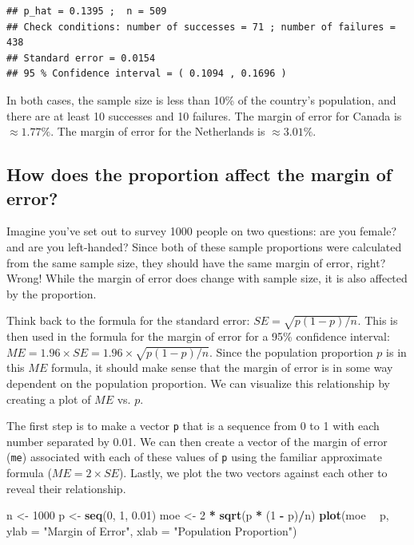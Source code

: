 \documentclass[]{article}
\newenvironment{Shaded}{\begin{snugshade}}{\end{snugshade}}
\newcommand{\KeywordTok}[1]{\textcolor[rgb]{0.13,0.29,0.53}{\textbf{#1}}}
\newcommand{\DataTypeTok}[1]{\textcolor[rgb]{0.13,0.29,0.53}{#1}}
\newcommand{\DecValTok}[1]{\textcolor[rgb]{0.00,0.00,0.81}{#1}}
\newcommand{\FloatTok}[1]{\textcolor[rgb]{0.00,0.00,0.81}{#1}}
\newcommand{\StringTok}[1]{\textcolor[rgb]{0.31,0.60,0.02}{#1}}
\newcommand{\OperatorTok}[1]{\textcolor[rgb]{0.81,0.36,0.00}{\textbf{#1}}}
\newcommand{\NormalTok}[1]{#1}
\begin{document}
\begin{verbatim}
## p_hat = 0.1395 ;  n = 509 
## Check conditions: number of successes = 71 ; number of failures = 438 
## Standard error = 0.0154 
## 95 % Confidence interval = ( 0.1094 , 0.1696 )
\end{verbatim}

In both cases, the sample size is less than 10\% of the country's
population, and there are at least 10 successes and 10 failures. The
margin of error for Canada is \(\approx 1.77\%\). The margin of error
for the Netherlands is \(\approx 3.01\%\).

\subsection{How does the proportion affect the margin of
error?}\label{how-does-the-proportion-affect-the-margin-of-error}

Imagine you've set out to survey 1000 people on two questions: are you
female? and are you left-handed? Since both of these sample proportions
were calculated from the same sample size, they should have the same
margin of error, right? Wrong! While the margin of error does change
with sample size, it is also affected by the proportion.

Think back to the formula for the standard error:
\(SE = \sqrt{p(1-p)/n}\). This is then used in the formula for the
margin of error for a 95\% confidence interval:
\(ME = 1.96\times SE = 1.96\times\sqrt{p(1-p)/n}\). Since the population
proportion \(p\) is in this \(ME\) formula, it should make sense that
the margin of error is in some way dependent on the population
proportion. We can visualize this relationship by creating a plot of
\(ME\) vs. \(p\).

The first step is to make a vector \texttt{p} that is a sequence from 0
to 1 with each number separated by 0.01. We can then create a vector of
the margin of error (\texttt{me}) associated with each of these values
of \texttt{p} using the familiar approximate formula
(\(ME = 2 \times SE\)). Lastly, we plot the two vectors against each
other to reveal their relationship.

\begin{Shaded}
\begin{Highlighting}[]
\NormalTok{n <-}\StringTok{ }\DecValTok{1000}
\NormalTok{p <-}\StringTok{ }\KeywordTok{seq}\NormalTok{(}\DecValTok{0}\NormalTok{, }\DecValTok{1}\NormalTok{, }\FloatTok{0.01}\NormalTok{)}
\NormalTok{moe <-}\StringTok{ }\DecValTok{2} \OperatorTok{*}\StringTok{ }\KeywordTok{sqrt}\NormalTok{(p }\OperatorTok{*}\StringTok{ }\NormalTok{(}\DecValTok{1} \OperatorTok{-}\StringTok{ }\NormalTok{p)}\OperatorTok{/}\NormalTok{n)}
\KeywordTok{plot}\NormalTok{(moe }\OperatorTok{~}\StringTok{ }\NormalTok{p, }\DataTypeTok{ylab =} \StringTok{"Margin of Error"}\NormalTok{, }\DataTypeTok{xlab =} \StringTok{"Population Proportion"}\NormalTok{)}
\end{Highlighting}
\end{Shaded}
\end{document}
